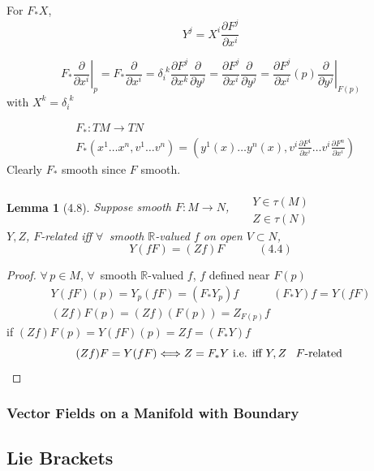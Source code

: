 \documentclass[11pt]{amsart}
\newtheorem{lemma}{Lemma}
\theoremstyle{definition}
\begin{document}
For $F_*X$,
\[
Y^j = X^i \frac{ \partial F^j}{ \partial x^i}
\]

\[
F_* \left. \frac{ \partial }{ \partial x^i } \right|_p = F_* \frac{ \partial }{ \partial x^i} = \delta_i^{ \, \, k } \frac{ \partial F^j}{ \partial x^k} \frac{ \partial }{ \partial y^j} = \frac{ \partial F^j}{ \partial x^i } \frac{ \partial }{ \partial y^j} = \frac{ \partial F^j}{ \partial x^i}(p) \left. \frac{ \partial }{ \partial y^j } \right|_{F(p)}
\]
with $X^k = \delta_i^{\, \, k}$

\[
\begin{aligned}
  &  F_* : TM \to TN \\
  & F_*( x^1 \dots x^n, v^1 \dots v^n) = (y^1(x) \dots y^n(x), v^i \frac{ \partial F^1}{ \partial x^i} \dots v^i \frac{ \partial F^n}{ \partial x^i} )
\end{aligned}
\]
Clearly $F_*$ smooth since $F$ smooth.

\begin{lemma}[4.8] Suppose smooth $F: M \to N$, \, $\begin{aligned} & \quad \\ & Y \in \tau(M) \\ & Z \in \tau(N) \end{aligned}$ \\
$Y,Z$, $F$-related iff $\forall \, $ smooth $\mathbb{R}$-valued $f$ on open $V \subset N$,
\[
Y(fF) = (Zf) F \quad \quad \quad (4.4)
\]
\end{lemma}

\begin{proof}
  $\forall \, p \in M$, $\forall \, $ smooth $\mathbb{R}$-valued $f$, $f$ defined near $F(p)$
\[
\begin{gathered}
  Y(fF)(p) = Y_p(fF) = (F_* Y_p)f \quad \quad \quad (F_*Y)f = Y(fF) \\
  (Zf)F(p) = (Zf)(F(p)) = Z_{F(p)}f
\end{gathered}
\]
if $(Zf) F(p) = Y(fF)(p) = Zf = (F_*Y) f $
\[
(Zf)F = Y(fF) \Longleftrightarrow Z = F_* Y \text{ i.e. iff $Y, Z$ \, $F$-related }
\]

\end{proof}



\subsubsection*{ Vector Fields on a Manifold with Boundary}

\subsection*{ Lie Brackets }
\end{document}
